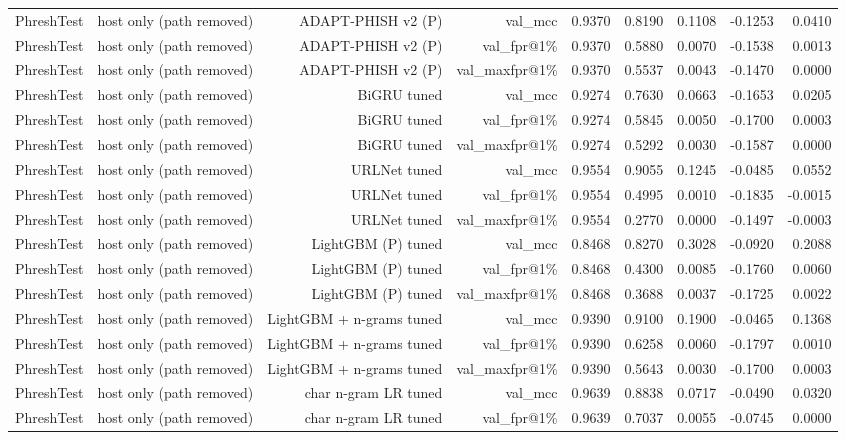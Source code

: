 \begin{table}[t]
\begin{tabular}{llrrrrrrr}
PhreshTest & host only (path removed) & ADAPT-PHISH v2 (P) & val\_mcc & 0.9370 & 0.8190 & 0.1108 & -0.1253 & 0.0410 \\
PhreshTest & host only (path removed) & ADAPT-PHISH v2 (P) & val\_fpr@1\% & 0.9370 & 0.5880 & 0.0070 & -0.1538 & 0.0013 \\
PhreshTest & host only (path removed) & ADAPT-PHISH v2 (P) & val\_maxfpr@1\% & 0.9370 & 0.5537 & 0.0043 & -0.1470 & 0.0000 \\
PhreshTest & host only (path removed) & BiGRU tuned & val\_mcc & 0.9274 & 0.7630 & 0.0663 & -0.1653 & 0.0205 \\
PhreshTest & host only (path removed) & BiGRU tuned & val\_fpr@1\% & 0.9274 & 0.5845 & 0.0050 & -0.1700 & 0.0003 \\
PhreshTest & host only (path removed) & BiGRU tuned & val\_maxfpr@1\% & 0.9274 & 0.5292 & 0.0030 & -0.1587 & 0.0000 \\
PhreshTest & host only (path removed) & URLNet tuned & val\_mcc & 0.9554 & 0.9055 & 0.1245 & -0.0485 & 0.0552 \\
PhreshTest & host only (path removed) & URLNet tuned & val\_fpr@1\% & 0.9554 & 0.4995 & 0.0010 & -0.1835 & -0.0015 \\
PhreshTest & host only (path removed) & URLNet tuned & val\_maxfpr@1\% & 0.9554 & 0.2770 & 0.0000 & -0.1497 & -0.0003 \\
PhreshTest & host only (path removed) & LightGBM (P) tuned & val\_mcc & 0.8468 & 0.8270 & 0.3028 & -0.0920 & 0.2088 \\
PhreshTest & host only (path removed) & LightGBM (P) tuned & val\_fpr@1\% & 0.8468 & 0.4300 & 0.0085 & -0.1760 & 0.0060 \\
PhreshTest & host only (path removed) & LightGBM (P) tuned & val\_maxfpr@1\% & 0.8468 & 0.3688 & 0.0037 & -0.1725 & 0.0022 \\
PhreshTest & host only (path removed) & LightGBM + n-grams tuned & val\_mcc & 0.9390 & 0.9100 & 0.1900 & -0.0465 & 0.1368 \\
PhreshTest & host only (path removed) & LightGBM + n-grams tuned & val\_fpr@1\% & 0.9390 & 0.6258 & 0.0060 & -0.1797 & 0.0010 \\
PhreshTest & host only (path removed) & LightGBM + n-grams tuned & val\_maxfpr@1\% & 0.9390 & 0.5643 & 0.0030 & -0.1700 & 0.0003 \\
PhreshTest & host only (path removed) & char n-gram LR tuned & val\_mcc & 0.9639 & 0.8838 & 0.0717 & -0.0490 & 0.0320 \\
PhreshTest & host only (path removed) & char n-gram LR tuned & val\_fpr@1\% & 0.9639 & 0.7037 & 0.0055 & -0.0745 & 0.0000 \\

\end{tabular}
\end{table}
